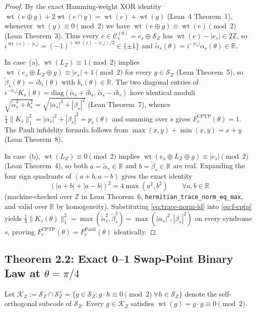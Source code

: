 \documentclass[11pt,a4paper]{article}
\theoremstyle{plain}
\theoremstyle{definition}
\newcommand{\R}{\mathbb{R}}
\newcommand{\SZ}{\mathcal{S}_Z}
\newcommand{\KZ}{\mathcal{K}_Z}
\newcommand{\wt}{\operatorname{wt}}
\begin{document}
\begin{proof}
By the exact Hamming-weight XOR identity $\wt(e \oplus g) + 2\wt(e \cap g) = \wt(e) + \wt(g)$ (Lean~4 Theorem~1), whenever $\wt(g) \equiv 0 \pmod 2$ we have $\wt(e \oplus g) \equiv \wt(e) \pmod 2$ (Lean Theorem~3). Thus every $e \in \mathcal{C}_s^{(0)} = e_s \oplus \SZ$ has $\wt(e) - |e_s| \in 2\mathbb{Z}$, so $i^{\wt(e) - |e_s|} = (-1)^{(\wt(e)-|e_s|)/2} \in \{\pm 1\}$ and $\tilde{\alpha}_s(\theta) = i^{-|e_s|}\alpha_s(\theta) \in \R$.

In case~(a), $\wt(L_Z) \equiv 1 \pmod 2$ implies $\wt(e_s \oplus L_Z \oplus g) \equiv |e_s| + 1 \pmod 2$ for every $g \in \SZ$ (Lean Theorem~5), so $\tilde{\beta}_s(\theta) = i b_s(\theta)$ with $b_s(\theta) \in \R$. The two diagonal entries of $i^{-|e_s|}K_s(\theta) = \mathrm{diag}(\tilde{\alpha}_s + i b_s,\, \tilde{\alpha}_s - i b_s)$ have identical moduli $\sqrt{\tilde{\alpha}_s^2 + b_s^2} = \sqrt{|\alpha_s|^2 + |\beta_s|^2}$ (Lean Theorem~7), whence $\frac{1}{4}\|K_s\|_1^2 = |\alpha_s|^2 + |\beta_s|^2 = p_s(\theta)$ and summing over $s$ gives $F_e^{\mathrm{CPTP}}(\theta) = 1$. The Pauli infidelity formula follows from $\max(x,y)+\min(x,y)=x+y$ (Lean Theorem~8).

In case~(b), $\wt(L_Z) \equiv 0 \pmod 2$ implies $\wt(e_s \oplus L_Z \oplus g) \equiv |e_s| \pmod 2$ (Lean Theorem~4), so both $a = \tilde{\alpha}_s \in \R$ and $b = \tilde{\beta}_s \in \R$ are real. Expanding the four sign quadrants of $(a+b, a-b)$ gives the exact identity
\begin{equation}
  (|a + b| + |a - b|)^2 = 4 \max(a^2, b^2) \qquad \forall a, b \in \R
  \label{eq:trace-norm-id}
\end{equation}
(machine-checked over $\mathbb{Z}$ in Lean Theorem~6, \texttt{hermitian\_trace\_norm\_eq\_max}, and valid over $\R$ by homogeneity). Substituting \eqref{eq:trace-norm-id} into \eqref{eq:f-cptp} yields $\frac{1}{4}\|K_s(\theta)\|_1^2 = \max(\tilde{\alpha}_s^2, \tilde{\beta}_s^2) = \max(|\alpha_s|^2, |\beta_s|^2)$ on every syndrome $s$, proving $F_e^{\mathrm{CPTP}}(\theta) = F_e^{\mathrm{Pauli}}(\theta)$ identically.
\end{proof}

\subsection{Theorem 2.2: Exact 0--1 Swap-Point Binary Law at \texorpdfstring{$\theta = \pi/4$}{theta = pi/4}}

Let $\KZ := \SZ \cap \SZ^\perp = \{g \in \SZ : g \cdot h \equiv 0 \pmod 2\;\forall h \in \SZ\}$ denote the self-orthogonal subcode of $\SZ$. Every $g \in \KZ$ satisfies $\wt(g) = g \cdot g \equiv 0 \pmod 2$.
\end{document}
